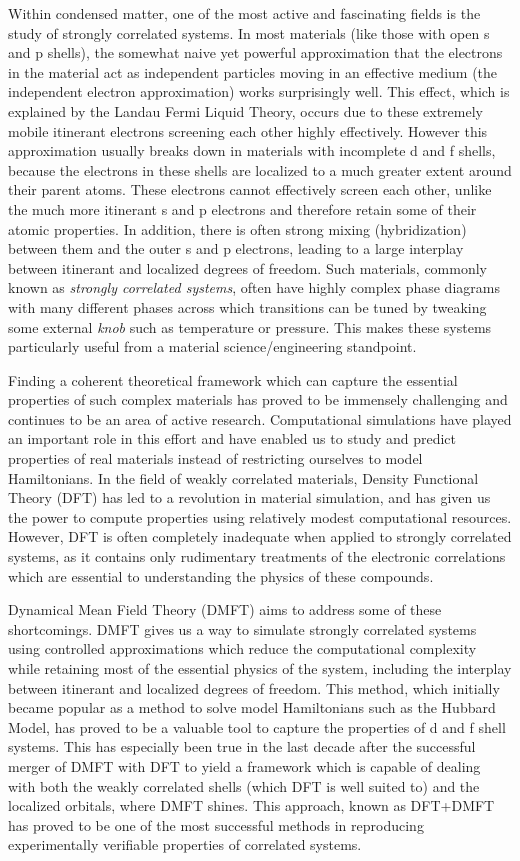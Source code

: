 \documentclass[12pt,letter]{article}
\begin{document}
Within condensed matter, one of the most active and fascinating fields is the study of strongly correlated systems. In most materials (like those with open s and p shells), the somewhat naive yet powerful approximation that the electrons in the material act as independent particles moving in an effective medium (the independent electron approximation) works surprisingly well. This effect, which is explained by the Landau Fermi Liquid Theory, occurs due to these extremely mobile itinerant electrons screening each other highly effectively. However this approximation usually breaks down in materials with incomplete d and f shells, because the electrons in these shells are localized to a much greater extent around their parent atoms. These electrons cannot effectively screen each other, unlike the much more itinerant s and p electrons and therefore retain some of their atomic properties. In addition, there is often strong mixing (hybridization) between them and the outer s and p electrons, leading to a large interplay between itinerant and localized degrees of freedom. Such materials, commonly known as \textit{strongly correlated systems}, often have highly complex phase diagrams with many different phases across which transitions can be tuned by tweaking some external \textit{knob} such as temperature or pressure. This makes these systems particularly useful from a material science/engineering standpoint.

Finding a coherent theoretical framework which can capture the essential properties of such complex materials has proved to be immensely challenging and continues to be an area of active research. Computational simulations have played an important role in this effort and have enabled us to study and predict properties of real materials instead of restricting ourselves to model Hamiltonians. In the field of weakly correlated materials, Density Functional Theory (DFT) has led to a revolution in material simulation, and has given us the power to compute properties using relatively modest computational resources. However, DFT is often completely inadequate when applied to strongly correlated systems, as it contains only rudimentary treatments of the electronic correlations which are essential to understanding the physics of these compounds.

Dynamical Mean Field Theory (DMFT) aims to address some of these shortcomings. DMFT gives us a way to simulate strongly correlated systems using controlled approximations which reduce the computational complexity while retaining most of the essential physics of the system, including the interplay between itinerant and localized degrees of freedom. This method, which initially became popular as a method to solve model Hamiltonians such as the Hubbard Model, has proved to be a valuable tool to capture the properties of d and f shell systems. This has especially been true in the last decade after the successful merger of DMFT with DFT to yield a framework which is capable of dealing with both the weakly correlated shells (which DFT is well suited to) and the localized orbitals, where DMFT shines. This approach, known as DFT+DMFT has proved to be one of the most successful methods in reproducing experimentally verifiable properties of correlated systems.
\end{document}
